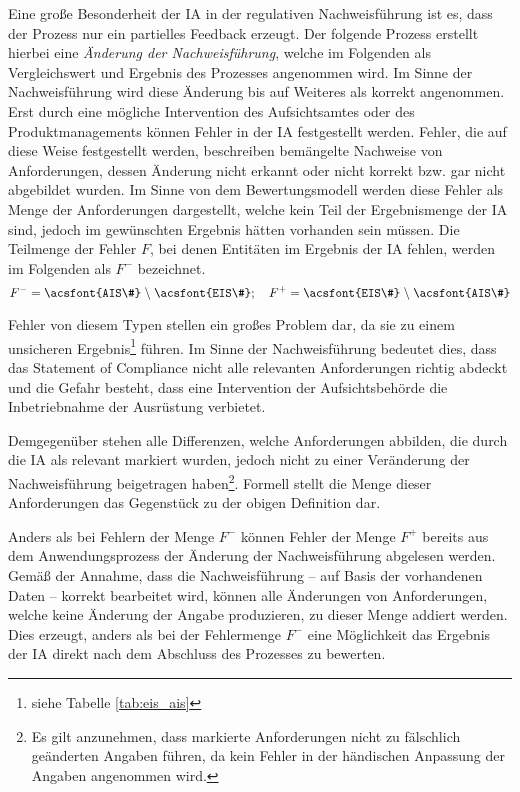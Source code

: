     Eine große Besonderheit der \ac{IA} in der regulativen Nachweisführung ist es, dass der Prozess nur ein partielles Feedback erzeugt.
    Der folgende Prozess erstellt hierbei eine \textit{Änderung der Nachweisführung}, welche im Folgenden als Vergleichswert und Ergebnis des Prozesses angenommen wird.
    Im Sinne der Nachweisführung wird diese Änderung bis auf Weiteres als korrekt angenommen.
    Erst durch eine mögliche Intervention des Aufsichtsamtes oder des Produktmanagements können Fehler in der \ac{IA} festgestellt werden.
    Fehler, die auf diese Weise festgestellt werden, beschreiben bemängelte Nachweise von Anforderungen, dessen Änderung nicht erkannt oder nicht korrekt bzw. gar nicht abgebildet wurden.
    Im Sinne von dem Bewertungsmodell werden diese Fehler als Menge der Anforderungen dargestellt, welche kein Teil der Ergebnismenge der \ac{IA} sind, jedoch im gewünschten Ergebnis hätten vorhanden sein müssen.
    Die Teilmenge der Fehler $F$, bei denen Entitäten im Ergebnis der \ac{IA} fehlen, werden im Folgenden als $F^-$ bezeichnet.
    $$
        F^- = \text{\acsfont{AIS\#}} \;\backslash\; \text{\acsfont{EIS\#}}; \quad 
        F^+ = \text{\acsfont{EIS\#}} \;\backslash\; \text{\acsfont{AIS\#}}
    $$
    
    \noindent
    Fehler von diesem Typen stellen ein großes Problem dar, da sie zu einem unsicheren Ergebnis\footnote{siehe Tabelle \ref{tab:eis_ais}} führen.
    Im Sinne der Nachweisführung bedeutet dies, dass das Statement of Compliance nicht alle relevanten Anforderungen richtig abdeckt und die Gefahr besteht, dass eine Intervention der Aufsichtsbehörde die Inbetriebnahme der Ausrüstung verbietet.
    
    \medskip
    Demgegenüber stehen alle Differenzen, welche Anforderungen abbilden, die durch die \ac{IA} als relevant markiert wurden, jedoch nicht zu einer Veränderung der Nachweisführung beigetragen haben\footnote{Es gilt anzunehmen, dass markierte Anforderungen nicht zu fälschlich geänderten Angaben führen, da kein Fehler in der händischen Anpassung der Angaben angenommen wird.}.
    Formell stellt die Menge dieser Anforderungen das Gegenstück zu der obigen Definition dar.
    
    \medskip
    Anders als bei Fehlern der Menge $F^-$ können Fehler der Menge $F^+$ bereits aus dem Anwendungsprozess der Änderung der Nachweisführung abgelesen werden.
    Gemäß der Annahme, dass die Nachweisführung -- auf Basis der vorhandenen Daten -- korrekt bearbeitet wird, können alle Änderungen von Anforderungen, welche keine Änderung der Angabe produzieren, zu dieser Menge addiert werden.
    Dies erzeugt, anders als bei der Fehlermenge $F^-$ eine Möglichkeit das Ergebnis der \ac{IA} direkt nach dem Abschluss des Prozesses zu bewerten.

